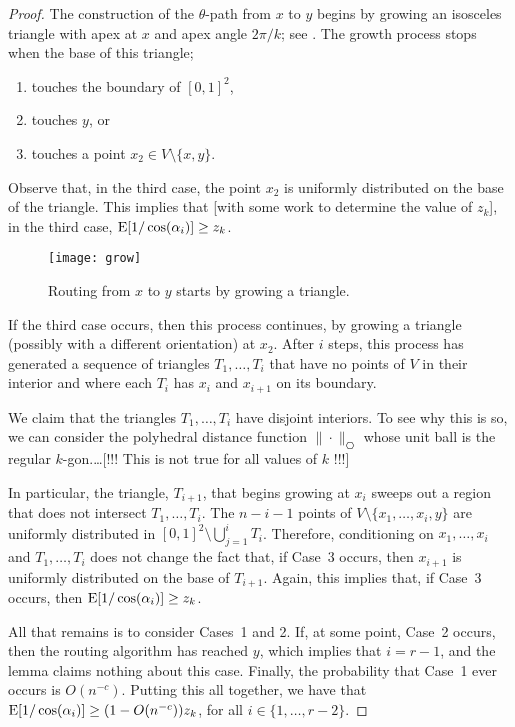 \documentclass{patmorin}
\begin{document}
\begin{proof}
  The construction of the $\theta$-path from $x$ to $y$ begins by growing
  an isosceles triangle with apex at $x$ and apex angle $2\pi/k$; see
  .  The growth process stops when the base of this triangle;
  \begin{enumerate}
    \item touches the boundary of $[0,1]^2$,
    \item touches $y$, or
    \item touches a point $x_2\in V\setminus\{x,y\}$.
  \end{enumerate}
  Observe that, in the third case, the point $x_2$ is uniformly
  distributed on the base of the triangle.  This implies that [with
  some work to determine the value of $z_k$], in the third case,
  $\mathrm{E}[1/\cos(\alpha_i)] \ge z_k$.  
  \begin{figure}
    \begin{center}
      \texttt{[image: grow]}
    \end{center}
    \caption{Routing from $x$ to $y$ starts by growing a triangle.}   
  \end{figure}
  If the third case occurs, then this process continues, by growing
  a triangle (possibly with a different orientation) at $x_2$.
  After $i$ steps, this process has generated a sequence of triangles
  $T_1,\ldots,T_i$ that have no points of $V$ in their interior and
  where each $T_i$ has $x_i$ and $x_{i+1}$ on its boundary.  

  We claim that the triangles $T_1,\ldots,T_i$ have disjoint interiors.
  To see why this is so, we can consider the polyhedral distance function
  $\|\cdot\|_{\hexagon}$ whose unit ball is the regular $k$-gon.\dots [!!! This is not true for all values of $k$ !!!]

  In particular, the triangle, $T_{i+1}$, that begins growing at
  $x_i$ sweeps out a region that does not intersect $T_1,\ldots,T_i$.
  The $n-i-1$ points of $V\setminus \{x_1,\ldots,x_i,y\}$ are uniformly
  distributed in $[0,1]^2\setminus \bigcup_{j=1}^{i} T_i$.  Therefore,
  conditioning on $x_1,\ldots,x_i$ and $T_1,\ldots,T_i$ does not change
  the fact that, if Case~3 occurs, then $x_{i+1}$ is uniformly distributed
  on the base of $T_{i+1}$.  Again, this implies that, if Case~3 occurs, then
  $\mathrm{E}[1/\cos(\alpha_i)]\ge z_k$.

  All that remains is to consider Cases~1 and 2.  If, at some point,
  Case~2 occurs, then the routing algorithm has reached $y$, which
  implies that $i=r-1$, and the lemma claims nothing about this case.
  Finally, the probability that Case~1 ever occurs is $O(n^{-c})$.
  Putting this all together, we have that $\mathrm{E}[1/\cos(\alpha_i)]\ge
  (1-O(n^{-c}))z_k$, for all $i\in\{1,\ldots,r-2\}$.
\end{proof}   
\end{document}

